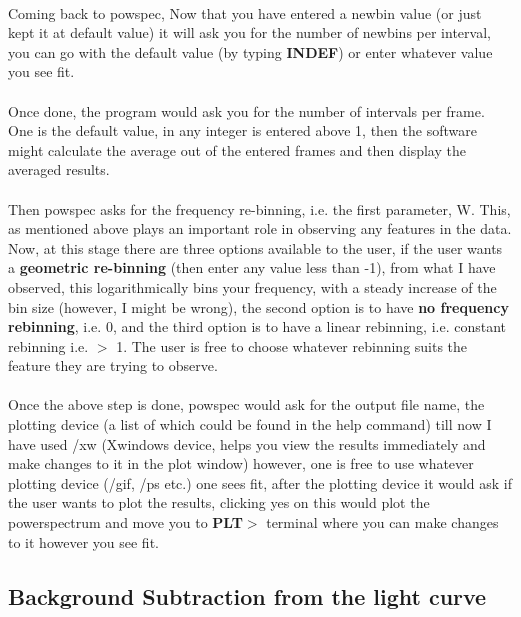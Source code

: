 \documentclass[a4paper,twoside]{report}
\numberwithin{equation}{section}
\begin{document}
\paragraph{}
Coming back to powspec, Now that you have entered a newbin value (or just kept it at default value) it will ask you for the number of newbins per interval, you can go with the default value (by typing \textbf{INDEF}) or enter whatever value you see fit. 
\paragraph{}
Once done, the program would ask you for the number of intervals per frame. One is the default value, in any integer is entered above 1, then the software might calculate the average out of the entered frames and then display the averaged results. 
\paragraph{}
Then powspec asks for the frequency re-binning, i.e. the first parameter, W. This, as mentioned above plays an important role in observing any features in the data. Now, at this stage there are three options available to the user, if the user wants a \textbf{geometric re-binning} (then enter any value less than -1), from what I have observed, this logarithmically bins your frequency, with a steady increase of the bin size (however, I might be wrong), the second option is to have \textbf{no frequency rebinning}, i.e. 0, and the third option is to have a linear rebinning, i.e. constant rebinning i.e. $>$ 1. The user is free to choose whatever rebinning suits the feature they are trying to observe. 
\paragraph{}
Once the above step is done, powspec would ask for the output file name, the plotting device (a list of which could be found in the help command) till now I have used /xw (Xwindows device, helps you view the results immediately and make changes to it in the plot window) however, one is free to use whatever plotting device (/gif, /ps etc.) one sees fit, after the plotting device it would ask if the user wants to plot the results, clicking yes on this would plot the powerspectrum and move you to \textbf{PLT$>$} terminal where you can make changes to it however you see fit. 
\subsection{Background Subtraction from the light curve}
\end{document}
